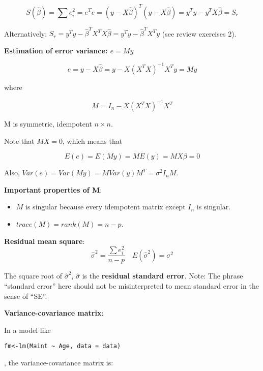 \begin{equation}
S(\hat{\beta}) = \sum e_i^2 = e^T e = (y-X\hat{\beta})^T (y-X\hat{\beta})  = y^T y - y^T X \hat{\beta} = S_r
\end{equation}

Alternatively: $S_r= y^Ty - \hat{\beta}^T X^T X\hat{\beta}=y^Ty - \hat{\beta}^T X^T y$ (see review exercises 2).

\textbf{Estimation of error variance: $e=My$}

\begin{equation}
e = y - X\hat{\beta} = y - X (X^T X)^{-1} X^T y = My
\end{equation}

\noindent
where

\begin{equation}
M = I_n -  X (X^T X)^{-1} X^T 
\end{equation}

M is symmetric, idempotent $n\times n$.

Note that $MX=0$, which means that 

\begin{equation}
E(e)=E(My) = ME(y)= MX\beta = 0
\end{equation}

Also, $Var(e) = Var(My) = M Var(y) M^T = \sigma^2 I_n M$.

\medskip
\textbf{Important properties of M}:

\begin{itemize}
\item $M$ is singular because every idempotent matrix except $I_n$ is singular.
\item $trace(M)=rank(M)=n-p$.
\end{itemize}

\medskip


\textbf{Residual mean square}:
\begin{equation}
\hat{\sigma}^2 = \frac{\sum e_i^ 2}{n-p} \quad E(\hat{\sigma}^2)=\sigma^2
\end{equation}

The square root of $\hat{\sigma}^2$, $\hat{\sigma}$ is the \textbf{residual standard error}.
Note: The phrase ``standard error'' here should not be misinterpreted to mean standard error in the sense of ``SE''. 

\textbf{Variance-covariance matrix}:

In a model like \begin{verbatim}fm<-lm(Maint ~ Age, data = data)\end{verbatim}, the variance-covariance matrix is:

